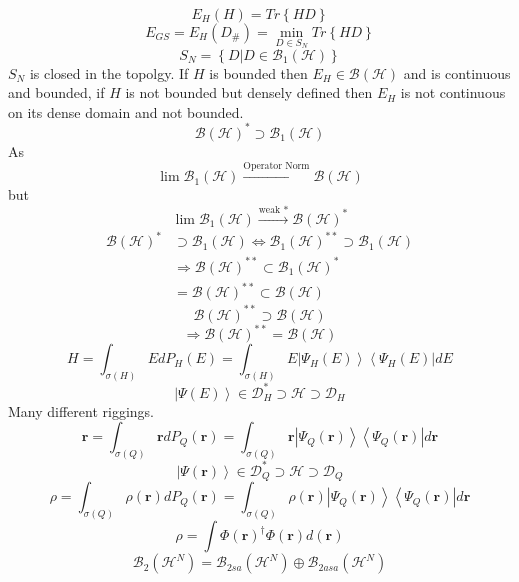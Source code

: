 \documentclass[aps,preprint]{revtex4}%
\begin{document}
\[
E_{H}\left(  H\right)  =Tr\left\{  HD\right\}
\]%
\[
E_{GS}=E_{H}\left(  D_{\#}\right)  =\min_{D\in S_{N}}Tr\left\{  HD\right\}
\]%
\[
S_{N}=\left\{  \left.  D\right\vert D\in\mathcal{B}_{1}\left(  \mathcal{H}%
\right)  \right\}
\]
$S_{N}$ is closed in the topolgy. If $H$ is bounded then $E_{H}\in
\mathcal{B}\left(  \mathcal{H}\right)  $ and is continuous and bounded, if $H$
is not bounded but densely defined then $E_{H}$ is not continuous on its dense
domain and not bounded.
\[
\mathcal{B}\left(  \mathcal{H}\right)  ^{\ast}\supset\mathcal{B}_{1}\left(
\mathcal{H}\right)
\]
As
\[
\lim\mathcal{B}_{1}\left(  \mathcal{H}\right)  \overset{\text{Operator Norm}%
}{\longrightarrow}\mathcal{B}\left(  \mathcal{H}\right)
\]
but
\[
\lim\mathcal{B}_{1}\left(  \mathcal{H}\right)  \overset{\text{weak *}%
}{\longrightarrow}\mathcal{B}\left(  \mathcal{H}\right)  ^{\ast}%
\]%
\begin{align*}
\mathcal{B}\left(  \mathcal{H}\right)  ^{\ast}  & \supset\mathcal{B}%
_{1}\left(  \mathcal{H}\right)  \Leftrightarrow\mathcal{B}_{1}\left(
\mathcal{H}\right)  ^{\ast\ast}\supset\mathcal{B}_{1}\left(  \mathcal{H}%
\right)  \\
& \Rightarrow\mathcal{B}\left(  \mathcal{H}\right)  ^{\ast\ast}\subset
\mathcal{B}_{1}\left(  \mathcal{H}\right)  ^{\ast}\\
& =\mathcal{B}\left(  \mathcal{H}\right)  ^{\ast\ast}\subset\mathcal{B}\left(
\mathcal{H}\right)
\end{align*}%
\[
\mathcal{B}\left(  \mathcal{H}\right)  ^{\ast\ast}\supset\mathcal{B}\left(
\mathcal{H}\right)
\]%
\[
\Rightarrow\mathcal{B}\left(  \mathcal{H}\right)  ^{\ast\ast}=\mathcal{B}%
\left(  \mathcal{H}\right)
\]%
\[
H=\int_{\sigma\left(  H\right)  }EdP_{H}\left(  E\right)  =\int_{\sigma\left(
H\right)  }E\left\vert \Psi_{H}\left(  E\right)  \right\rangle \left\langle
\Psi_{H}\left(  E\right)  \right\vert dE
\]%
\[
\left\vert \Psi\left(  E\right)  \right\rangle \in\mathcal{D}_{H}^{\ast
}\supset\mathcal{H\supset D}_{H}%
\]
Many different riggings.%
\[
\boldsymbol{r}=\int_{\sigma\left(  Q\right)  }\boldsymbol{r}dP_{Q}\left(
\boldsymbol{r}\right)  =\int_{\sigma\left(  Q\right)  }\boldsymbol{r}%
\left\vert \Psi_{Q}\left(  \boldsymbol{r}\right)  \right\rangle \left\langle
\Psi_{Q}\left(  \boldsymbol{r}\right)  \right\vert d\boldsymbol{r}%
\]%
\[
\left\vert \Psi\left(  \boldsymbol{r}\right)  \right\rangle \in\mathcal{D}%
_{Q}^{\ast}\supset\mathcal{H\supset D}_{Q}%
\]%
\[
\rho=\int_{\sigma\left(  Q\right)  }\rho\left(  \boldsymbol{r}\right)
dP_{Q}\left(  \boldsymbol{r}\right)  =\int_{\sigma\left(  Q\right)  }%
\rho\left(  \boldsymbol{r}\right)  \left\vert \Psi_{Q}\left(  \boldsymbol{r}%
\right)  \right\rangle \left\langle \Psi_{Q}\left(  \boldsymbol{r}\right)
\right\vert d\boldsymbol{r}%
\]%
\[
\rho=\int\Phi\left(  \boldsymbol{r}\right)  ^{\dagger}\Phi\left(
\boldsymbol{r}\right)  d\left(  \boldsymbol{r}\right)
\]%
\begin{equation}
\mathcal{B}_{2}\left(  \mathcal{H}^{N}\right)  =\mathcal{B}_{2sa}\left(
\mathcal{H}^{N}\right)  \oplus\mathcal{B}_{2asa}\left(  \mathcal{H}%
^{N}\right)
\end{equation}
%
\end{document}
